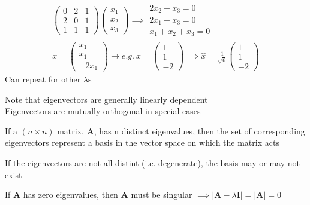 \documentclass[a4paper, 11pt, normalem]{report}
\begin{document}
\begin{gather*}
    \begin{pmatrix}
        0 & 2 & 1 \\
        2 & 0 & 1 \\
        1 & 1 & 1
    \end{pmatrix}
    \begin{pmatrix}
        x_1 \\
        x_2 \\
        x_3
    \end{pmatrix} \implies
    \begin{matrix*}
        2x_2 + x_3 = 0 \\
        2x_1 + x_3 = 0 \\
        x_1 + x_2 + x_3 = 0
    \end{matrix*} \\
    \bar{x} =
    \begin{pmatrix}
          x_1 \\
          x_1 \\
        -2x_1
    \end{pmatrix} \to e.g.~ \bar{x} =
    \begin{pmatrix}
         1 \\
         1 \\
        -2
    \end{pmatrix} \implies \hat{x} = \frac{1}{\sqrt{6}}
    \begin{pmatrix}
         1 \\
         1 \\
        -2
    \end{pmatrix}
\end{gather*}
Can repeat for other $\lambda$s

Note that eigenvectors are generally linearly dependent \\
Eigenvectors are mutually orthogonal in special cases

If a $(n \times n)$ matrix, $\mathbf{A}$, has n distinct eigenvalues, then the set of corresponding eigenvectors represent a basis in the vector space on which the matrix acts

If the eigenvectors are not all distint (i.e. degenerate), the basis may or may not exist

If $\mathbf{A}$ has zero eigenvalues, then $\mathbf{A}$ must be singular $\implies |\mathbf{A} - \lambda\mathbf{I}| = |\mathbf{A}| = 0$
\end{document}
